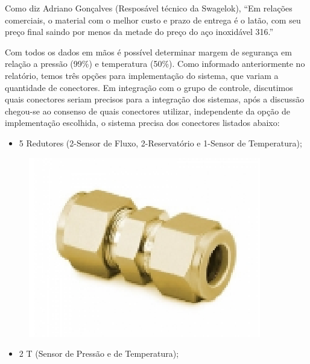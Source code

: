 Como diz Adriano Gonçalves (Resposável técnico da Swagelok), “Em relações comerciais, o material com o melhor custo e prazo de entrega é o latão, com seu preço final saindo por menos da metade do preço do aço inoxidável 316.”

Com todos os dados em mãos é possível determinar margem de segurança em relação a pressão (99\%) e temperatura (50\%).
Como informado anteriormente no relatório, temos três opções para implementação do sistema, que variam a quantidade de conectores. Em integração com o grupo de controle, discutimos quais conectores seriam precisos para a integração dos sistemas, após a discussão chegou-se ao consenso de quais conectores utilizar, independente da opção de implementação escolhida, o sistema precisa dos conectores listados abaixo: 

\begin{itemize}
\item 5 Redutores (2-Sensor de Fluxo, 2-Reservatório e 1-Sensor de Temperatura);
\end{itemize}

\begin{figure}[!htb]                                                               
   \centering                                                                      
   \includegraphics[scale=0.6, keepaspectratio=true]{figuras/peca1.eps} 
\end{figure}


\begin{itemize}
\item 2 T (Sensor de Pressão e de Temperatura);
\end{itemize}

